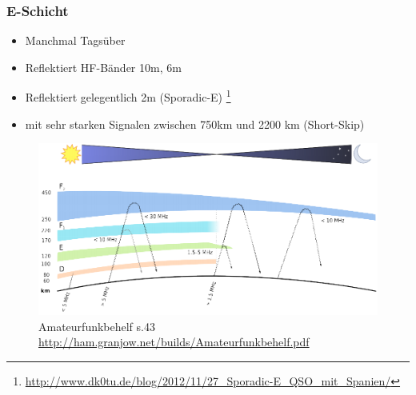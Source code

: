 \begin{frame}
    \frametitle{E-Schicht}
    \begin{itemize}
    	  \item Manchmal Tagsüber
	   \item Reflektiert HF-Bänder 10m, 6m
            \item Reflektiert gelegentlich 2m (Sporadic-E) \footnote{\tiny \url{http://www.dk0tu.de/blog/2012/11/27_Sporadic-E_QSO_mit_Spanien/}}
            \item mit sehr starken Signalen zwischen 750km und 2200 km (Short-Skip)
    \end{itemize}
    \begin{center}
      \begin{figure}
        \includegraphics[width=.8\textwidth,height=.4\textheight,keepaspectratio]{e09/schichten_behelf_43.png}
       \caption{Amateurfunkbehelf s.43 \ExternalLink \url{http://ham.granjow.net/builds/Amateurfunkbehelf.pdf}}
      \end{figure}
    \end{center}
\end{frame}

